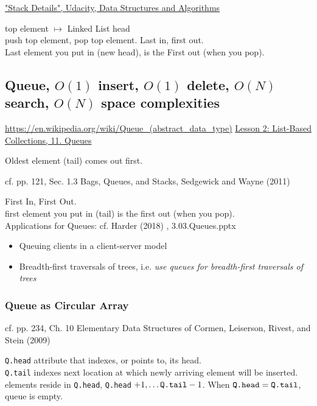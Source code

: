 \documentclass[10pt]{amsart}
\begin{document}
\href{https://classroom.udacity.com/courses/ud513/lessons/7117335401/concepts/71225347790923}{"Stack Details", Udacity, Data Structures and Algorithms}

top element $\mapsto $ Linked List head \\
push top element, pop top element.
Last in, first out. \\
Last element you put in (new head), is the First out (when you pop).

\subsection{Queue, $O(1)$ insert, $O(1)$ delete, $O(N)$ search, $O(N)$ space complexities}

\url{https://en.wikipedia.org/wiki/Queue_(abstract_data_type)}
\href{https://classroom.udacity.com/courses/ud513/lessons/7117335401/concepts/71222050580923}{Lesson 2: List-Based Collections, 11. Queues}

Oldest element (tail) comes out first.

cf. pp. 121, Sec. 1.3 Bags, Queues, and Stacks, Sedgewick and Wayne (2011) \cite{SeWa2011}


First In, First Out. \\
first element you put in (tail) is the first out (when you pop). \\

Applications for Queues: cf. Harder (2018) \cite{Hard2018}, 3.03.Queues.pptx
\begin{itemize}
	\item Queuing clients in a client-server model
	\item Breadth-first traversals of trees, i.e. \emph{use queues for breadth-first traversals of trees}
\end{itemize}

\subsubsection{Queue as Circular Array}

cf. pp. 234, Ch. 10 Elementary Data Structures of Cormen, Leiserson, Rivest, and Stein (2009) \cite{CLRS2009}

\verb|Q.head| attribute that indexes, or points to, its head. \\
\verb|Q.tail| indexes next location at which newly arriving element will be inserted. \\
elements reside in \verb|Q.head|, \verb|Q.head| $+1, \dots \verb|Q.tail| - 1$. When $\verb|Q.head| = \verb|Q.tail|$, queue is empty.
\end{document}
